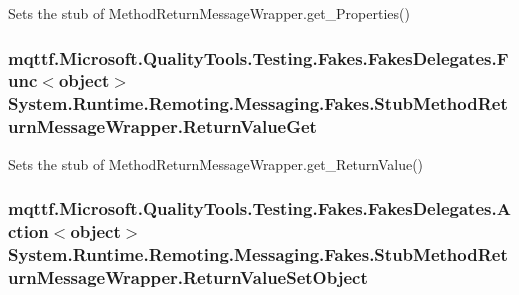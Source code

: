 Sets the stub of Method\-Return\-Message\-Wrapper.\-get\-\_\-\-Properties()

\hypertarget{class_system_1_1_runtime_1_1_remoting_1_1_messaging_1_1_fakes_1_1_stub_method_return_message_wrapper_ace457bb920bc766d63a7882363c7eb90}{
\subsubsection[{Return\-Value\-Get}]{\setlength{\rightskip}{0pt plus 5cm}mqttf.\-Microsoft.\-Quality\-Tools.\-Testing.\-Fakes.\-Fakes\-Delegates.\-Func$<$object$>$ System.\-Runtime.\-Remoting.\-Messaging.\-Fakes.\-Stub\-Method\-Return\-Message\-Wrapper.\-Return\-Value\-Get}}\label{class_system_1_1_runtime_1_1_remoting_1_1_messaging_1_1_fakes_1_1_stub_method_return_message_wrapper_ace457bb920bc766d63a7882363c7eb90}


Sets the stub of Method\-Return\-Message\-Wrapper.\-get\-\_\-\-Return\-Value()

\hypertarget{class_system_1_1_runtime_1_1_remoting_1_1_messaging_1_1_fakes_1_1_stub_method_return_message_wrapper_a2378b9f760bc556c4962c8ca6992ff78}{
\subsubsection[{Return\-Value\-Set\-Object}]{\setlength{\rightskip}{0pt plus 5cm}mqttf.\-Microsoft.\-Quality\-Tools.\-Testing.\-Fakes.\-Fakes\-Delegates.\-Action$<$object$>$ System.\-Runtime.\-Remoting.\-Messaging.\-Fakes.\-Stub\-Method\-Return\-Message\-Wrapper.\-Return\-Value\-Set\-Object}}\label{class_system_1_1_runtime_1_1_remoting_1_1_messaging_1_1_fakes_1_1_stub_method_return_message_wrapper_a2378b9f760bc556c4962c8ca6992ff78}


